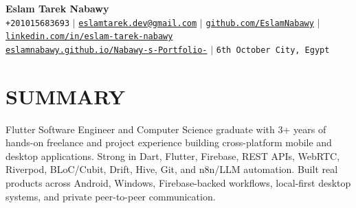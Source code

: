 \documentclass[letterpaper,11pt]{article}
\begin{document}
\begin{center}
    \textbf{\Huge Eslam Tarek Nabawy} \\ \vspace{5pt}
    \small \faPhone* \hspace{2pt} \texttt{+201015683693} \hspace{1pt} $|$
    \hspace{1pt} \faEnvelope \hspace{2pt} \href{mailto:eslamtarek.dev@gmail.com}{\texttt{eslamtarek.dev@gmail.com}} \hspace{1pt} $|$
    \hspace{1pt} \faGithub \hspace{2pt} \href{https://github.com/EslamNabawy}{\texttt{github.com/EslamNabawy}} \hspace{1pt} $|$
    \hspace{1pt} \faLinkedin \hspace{2pt} \href{https://www.linkedin.com/in/eslam-tarek-nabawy/}{\texttt{linkedin.com/in/eslam-tarek-nabawy}}
    \\ \vspace{2pt}
    \small
    \faGlobe \hspace{2pt} \href{https://eslamnabawy.github.io/Nabawy-s-Portfolio-/}{\texttt{eslamnabawy.github.io/Nabawy-s-Portfolio-}} \hspace{1pt} $|$
    \hspace{1pt} \faMapMarker* \hspace{2pt}\texttt{6th October City, Egypt}
    \\ \vspace{-3pt}
\end{center}

\section{SUMMARY}
 \begin{itemize}[leftmargin=0in, label={}]
    \small{\item{
    Flutter Software Engineer and Computer Science graduate with 3+ years of hands-on freelance and project experience building cross-platform mobile and desktop applications. Strong in Dart, Flutter, Firebase, REST APIs, WebRTC, Riverpod, BLoC/Cubit, Drift, Hive, Git, and n8n/LLM automation. Built real products across Android, Windows, Firebase-backed workflows, local-first desktop systems, and private peer-to-peer communication.
    }}
 \end{itemize}
\end{document}
